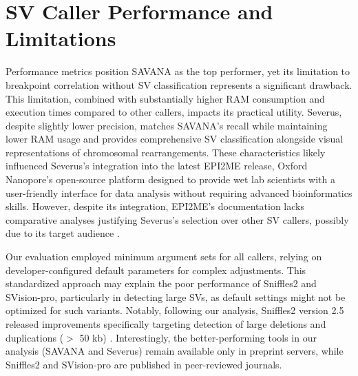 \section{SV Caller Performance and Limitations}

Performance metrics position SAVANA as the top performer, yet its limitation to 
breakpoint correlation without SV classification represents a significant 
drawback. This limitation, combined with substantially higher RAM consumption 
and execution times compared to other callers, impacts its practical utility. 
Severus, despite slightly lower precision, matches SAVANA's recall while 
maintaining lower RAM usage and provides comprehensive SV classification 
alongside visual representations of chromosomal rearrangements. These 
characteristics likely influenced Severus's integration into the latest EPI2ME 
release, Oxford Nanopore's open-source platform designed to provide wet lab 
scientists with a user-friendly interface for data analysis without requiring 
advanced bioinformatics skills. However, despite its integration, EPI2ME's 
documentation lacks comparative analyses justifying Severus's selection over 
other SV callers, possibly due to its target audience 
\cite{oxford_nanopore_technologies_epi2me_nodate}.



Our evaluation employed minimum argument sets for all callers, relying on 
developer-configured default parameters for complex adjustments. This 
standardized approach may explain the poor performance of Sniffles2 and 
SVision-pro, particularly in detecting large SVs, as default settings might not 
be optimized for such variants. Notably, following our analysis, Sniffles2 
version 2.5 released improvements specifically targeting detection of large 
deletions and duplications ($>$ 50 kb) \cite{noauthor_releases_nodate}. 
Interestingly, the better-performing tools in our analysis (SAVANA and Severus) 
remain available only in preprint servers, while Sniffles2 and SVision-pro are 
published in peer-reviewed journals.

